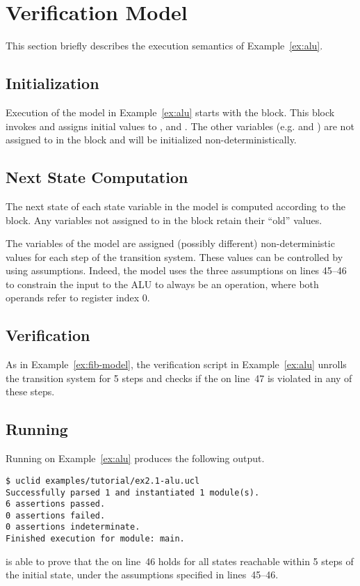 \section{Verification Model}
This section briefly describes the execution semantics of Example~\ref{ex:alu}.

\subsection{Initialization}
Execution of the model in Example~\ref{ex:alu} starts with the  block. This block invokes  and assigns initial values to ,  and . The other variables (e.g.  and ) are not assigned to in the  block and will be initialized non-deterministically.

\subsection{Next State Computation}
The next state of each state variable in the model is computed according to the  block. Any variables not assigned to in the  block retain their ``old'' values.

The  variables of the model are assigned (possibly different) non-deterministic values for each step of the transition system. These values can be controlled by using assumptions. Indeed, the model uses the three assumptions on lines 45--46 to constrain the input to the ALU to always be an  operation, where both operands refer to register index 0.

\subsection{Verification}
As in Example~\ref{ex:fib-model}, the verification script in Example~\ref{ex:alu} unrolls the transition system for 5 steps and checks if the  on line~47 is violated in any of these steps.

\subsection{Running \uclid{}}

Running \uclid{} on Example~\ref{ex:alu} produces the following output.

\begin{Verbatim}[frame=single, samepage=true]
$ uclid examples/tutorial/ex2.1-alu.ucl
Successfully parsed 1 and instantiated 1 module(s).
6 assertions passed.
0 assertions failed.
0 assertions indeterminate.
Finished execution for module: main.
\end{Verbatim}

\uclid{} is able to prove that the  on line~46 holds for all states reachable within 5 steps of the initial state, under the assumptions specified in lines~45--46.
